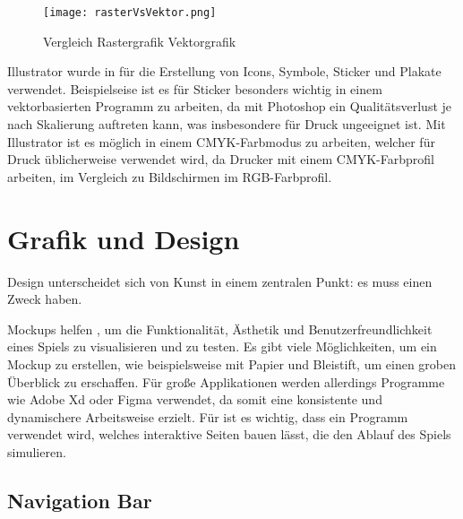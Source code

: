 \begin{figure}[H]
    \centering
    \texttt{[image: rasterVsVektor.png]}
    \caption{Vergleich Rastergrafik Vektorgrafik}
\end{figure}

Illustrator wurde in \FF für die Erstellung von Icons, Symbole, Sticker und Plakate verwendet. Beispielseise ist es für Sticker besonders wichtig in einem vektorbasierten Programm zu arbeiten, da mit Photoshop ein Qualitätsverlust je nach Skalierung auftreten kann, was insbesondere für Druck ungeeignet ist. Mit Illustrator ist es möglich in einem CMYK-Farbmodus zu arbeiten, welcher für Druck üblicherweise verwendet wird, da Drucker mit einem CMYK-Farbprofil arbeiten, im Vergleich zu Bildschirmen im RGB-Farbprofil.

\section{Grafik und Design}

\begin{coolQuote}
    Design unterscheidet sich von Kunst in einem zentralen Punkt: es muss einen Zweck haben.
\end{coolQuote}

Mockups
helfen
, um
die
Funktionalität, Ästhetik und Benutzerfreundlichkeit eines Spiels zu visualisieren und zu testen. Es gibt viele Möglichkeiten, um ein Mockup zu erstellen, wie beispielsweise mit Papier und Bleistift, um einen groben Überblick zu erschaffen. Für große Applikationen werden allerdings Programme wie Adobe Xd oder Figma verwendet, da somit eine konsistente und dynamischere Arbeitsweise erzielt. Für \FF ist es wichtig, dass ein Programm verwendet wird, welches interaktive Seiten bauen lässt, die den Ablauf des Spiels simulieren.

\subsection{Navigation Bar}


